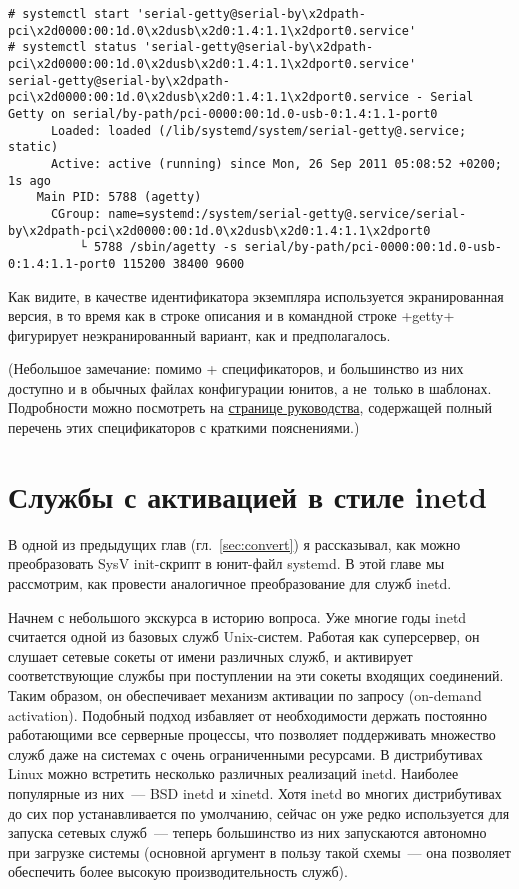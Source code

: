\documentclass[10pt,oneside,a4paper]{article}
\begin{document}
\begin{landscape}
\begin{Verbatim}[fontsize=\small]
# systemctl start 'serial-getty@serial-by\x2dpath-pci\x2d0000:00:1d.0\x2dusb\x2d0:1.4:1.1\x2dport0.service'
# systemctl status 'serial-getty@serial-by\x2dpath-pci\x2d0000:00:1d.0\x2dusb\x2d0:1.4:1.1\x2dport0.service'
serial-getty@serial-by\x2dpath-pci\x2d0000:00:1d.0\x2dusb\x2d0:1.4:1.1\x2dport0.service - Serial Getty on serial/by-path/pci-0000:00:1d.0-usb-0:1.4:1.1-port0
	  Loaded: loaded (/lib/systemd/system/serial-getty@.service; static)
	  Active: active (running) since Mon, 26 Sep 2011 05:08:52 +0200; 1s ago
	Main PID: 5788 (agetty)
	  CGroup: name=systemd:/system/serial-getty@.service/serial-by\x2dpath-pci\x2d0000:00:1d.0\x2dusb\x2d0:1.4:1.1\x2dport0
		  └ 5788 /sbin/agetty -s serial/by-path/pci-0000:00:1d.0-usb-0:1.4:1.1-port0 115200 38400 9600
\end{Verbatim}
\end{landscape}
Как видите, в качестве идентификатора экземпляра используется экранированная
версия, в то время как в строке описания и в командной строке +getty+
фигурирует неэкранированный вариант, как и предполагалось.

(Небольшое замечание: помимо +%
спецификаторов, и большинство из них доступно и в обычных файлах конфигурации
юнитов, а не~только в шаблонах. Подробности можно посмотреть на
\href{http://0pointer.de/public/systemd-man/systemd.unit.html}{странице
руководства}, содержащей полный перечень этих спецификаторов с краткими
пояснениями.)

\section{Службы с активацией в стиле inetd}
\label{sec:inetd}

В одной из предыдущих глав (гл.~\ref{sec:convert}) я рассказывал, как можно
преобразовать SysV init-скрипт в юнит-файл systemd. В этой главе мы рассмотрим,
как провести аналогичное преобразование для служб inetd.

Начнем с небольшого экскурса в историю вопроса. Уже многие годы 
inetd считается одной из базовых служб Unix-систем. Работая как суперсервер, он
слушает сетевые сокеты от имени различных служб, и активирует соответствующие
службы при поступлении на эти сокеты входящих соединений. Таким образом, он
обеспечивает механизм активации по запросу (on-demand activation). Подобный
подход избавляет от необходимости держать постоянно работающими все серверные
процессы, что позволяет поддерживать множество служб даже на системах с очень
ограниченными ресурсами. В дистрибутивах Linux можно встретить
несколько различных реализаций inetd. Наиболее популярные из них~--- BSD
inetd и xinetd. Хотя inetd во многих дистрибутивах до сих пор устанавливается по
умолчанию, сейчас он уже редко используется для запуска сетевых служб~--- теперь 
большинство из них запускаются автономно при загрузке системы (основной
аргумент в пользу такой схемы~--- она позволяет обеспечить более высокую
производительность служб).
\end{document}
